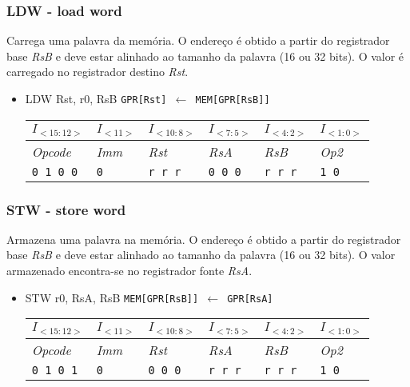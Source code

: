 \documentclass{extreport}
\begin{document}
\subsubsection{LDW - load word}
Carrega uma palavra da memória. O endereço é obtido a partir do registrador base \textit{RsB} e deve estar alinhado ao tamanho da palavra (16 ou 32 bits). O valor é carregado no registrador destino \textit{Rst}.

\begin{itemize}
\item LDW Rst, r0, RsB
\subitem \texttt{GPR[Rst] $\leftarrow$ MEM[GPR[RsB]]}
\begin{table}[ht!]
\centering
\begin{tabular}{|p{1.6cm}|p{1.6cm}|p{1.6cm}|p{1.6cm}|p{1.6cm}|p{1.6cm}|}
\hline
$I_{<15:12>}$ & $I_{<11>}$ & $I_{<10:8>}$ & $I_{<7:5>}$ & $I_{<4:2>}$ & $I_{<1:0>}$ \\ \hline
\textit{Opcode} & \textit{Imm} & \textit{Rst} & \textit{RsA} & \textit{RsB} & \textit{Op2} \\ \hline
\texttt{0 1 0 0} & \texttt{0} & \texttt{r r r} & \texttt{0 0 0} & \texttt{r r r} & \texttt{1 0} \\ \hline
\end{tabular}
\end{table}
\end{itemize}

\subsubsection{STW - store word}
Armazena uma palavra na memória. O endereço é obtido a partir do registrador base \textit{RsB} e deve estar alinhado ao tamanho da palavra (16 ou 32 bits). O valor armazenado encontra-se no registrador fonte \textit{RsA}.

\begin{itemize}
\item STW r0, RsA, RsB
\subitem \texttt{MEM[GPR[RsB]] $\leftarrow$ GPR[RsA]}
\begin{table}[ht!]
\centering
\begin{tabular}{|p{1.6cm}|p{1.6cm}|p{1.6cm}|p{1.6cm}|p{1.6cm}|p{1.6cm}|}
\hline
$I_{<15:12>}$ & $I_{<11>}$ & $I_{<10:8>}$ & $I_{<7:5>}$ & $I_{<4:2>}$ & $I_{<1:0>}$ \\ \hline
\textit{Opcode} & \textit{Imm} & \textit{Rst} & \textit{RsA} & \textit{RsB} & \textit{Op2} \\ \hline
\texttt{0 1 0 1} & \texttt{0} & \texttt{0 0 0} & \texttt{r r r} & \texttt{r r r} & \texttt{1 0} \\ \hline
\end{tabular}
\end{table}
\end{itemize}
\end{document}
